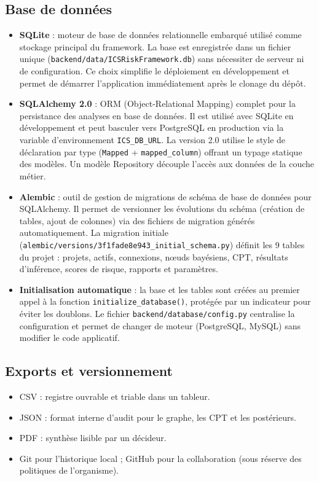 \documentclass[12pt,a4paper]{article}
\newcommand{\forcereset}[1]{%
    \needspace{#1\baselineskip}%
}
\begin{document}
\subsection{Base de données}
\forcereset{4}
\begin{itemize}[leftmargin=1.2cm, itemsep=0.2\baselineskip]
    \item \textbf{SQLite} : moteur de base de données relationnelle embarqué utilisé comme stockage principal du framework. La base est enregistrée dans un fichier unique (\texttt{backend/data/ICSRiskFramework.db}) sans nécessiter de serveur ni de configuration. Ce choix simplifie le déploiement en développement et permet de démarrer l'application immédiatement après le clonage du dépôt.
    \item \textbf{SQLAlchemy 2.0} : ORM (Object-Relational Mapping) complet pour la persistance des analyses en base de données. Il est utilisé avec SQLite en développement et peut basculer vers PostgreSQL en production via la variable d'environnement \texttt{ICS\_DB\_URL}. La version 2.0 utilise le style de déclaration par type (\texttt{Mapped} + \texttt{mapped\_column}) offrant un typage statique des modèles. Un modèle Repository découple l'accès aux données de la couche métier.
    \item \textbf{Alembic} : outil de gestion de migrations de schéma de base de données pour SQLAlchemy. Il permet de versionner les évolutions du schéma (création de tables, ajout de colonnes) via des fichiers de migration générés automatiquement. La migration initiale (\texttt{alembic/versions/3f1fade8e943\_initial\_schema.py}) définit les 9 tables du projet : projets, actifs, connexions, nœuds bayésiens, CPT, résultats d'inférence, scores de risque, rapports et paramètres.
    \item \textbf{Initialisation automatique} : la base et les tables sont créées au premier appel à la fonction \texttt{initialize\_database()}, protégée par un indicateur pour éviter les doublons. Le fichier \texttt{backend/database/config.py} centralise la configuration et permet de changer de moteur (PostgreSQL, MySQL) sans modifier le code applicatif.
\end{itemize}

\newpage
\subsection{Exports et versionnement}
\forcereset{5}
\begin{itemize}[leftmargin=1.2cm, itemsep=0.2\baselineskip]
    \item CSV : registre ouvrable et triable dans un tableur.
    \item JSON : format interne d'audit pour le graphe, les CPT et les postérieurs.
    \item PDF : synthèse lisible par un décideur.
    \item Git pour l'historique local ; GitHub pour la collaboration (sous réserve des politiques de l'organisme).
\end{itemize}
\end{document}
